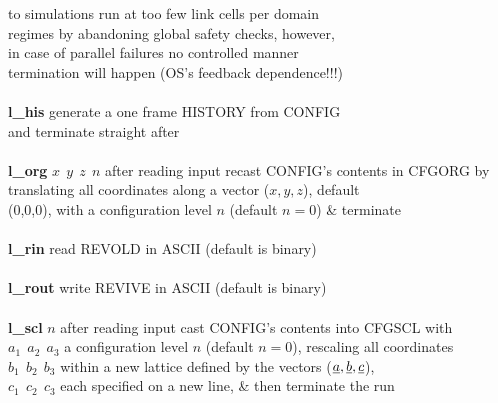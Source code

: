 \begin{tabbing}
\>                                              \> to simulations run at too few link cells per domain \\
\>                                              \> regimes by abandoning global safety checks, however, \\
\>                                              \> in case of parallel failures no controlled manner \\
\>                                              \> termination will happen (OS's feedback dependence!!!) \\
\>                                              \> \\
\> {\bf l\_his}                                 \> generate a one frame HISTORY from CONFIG \\
\>                                              \> and terminate straight after \\
\>                                              \> \\
\> {\bf l\_org} $x~~y~~z~~n$                    \> after reading input recast CONFIG's contents in CFGORG by \\
\>                                              \> translating all coordinates along a vector ($x,y,z$), default \\
\>                                              \> (0,0,0), with a configuration level $n$ (default $n=0$) \& terminate \\
\>                                              \> \\
\> {\bf l\_rin}                                 \> read REVOLD in ASCII (default is binary) \\
\>                                              \> \\
\> {\bf l\_rout}                                \> write REVIVE in ASCII (default is binary) \\
\>                                              \> \\
\> {\bf l\_scl} \phantom{xxx} $n$               \> after reading input cast CONFIG's contents into CFGSCL with \\
\> \phantom{xxxxxxxx} $a_{1}~~a_{2}~~a_{3}$     \> a configuration level $n$ (default $n=0$), rescaling all coordinates \\
\> \phantom{xxxxxxxx} $b_{1}~~b_{2}~~b_{3}$     \> within a new lattice defined by the vectors ($\mbox{$\underline{a}$},\mbox{$\underline{b}$},\mbox{$\underline{c}$}$), \\
\> \phantom{xxxxxxxx} $c_{1}~~c_{2}~~c_{3}$     \> each specified on a new line, \& then terminate the run \\

\end{tabbing}
